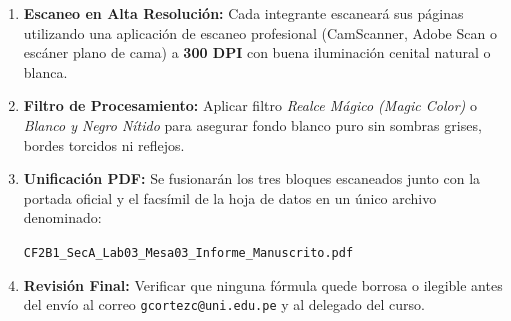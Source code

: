 \documentclass[a4paper, 10pt]{article}
\begin{document}
\begin{tcolorbox}[title=Procedimiento de Digitalización para Envío Oficial, colframe=box-green]
    \footnotesize
    \begin{enumerate}[leftmargin=1.5em, itemsep=2.5pt]
        \item \textbf{Escaneo en Alta Resolución:} Cada integrante escaneará sus páginas utilizando una aplicación de escaneo profesional (CamScanner, Adobe Scan o escáner plano de cama) a \textbf{300 DPI} con buena iluminación cenital natural o blanca.
        \item \textbf{Filtro de Procesamiento:} Aplicar filtro \textit{Realce Mágico (Magic Color)} o \textit{Blanco y Negro Nítido} para asegurar fondo blanco puro sin sombras grises, bordes torcidos ni reflejos.
        \item \textbf{Unificación PDF:} Se fusionarán los tres bloques escaneados junto con la portada oficial y el facsímil de la hoja de datos en un único archivo denominado:
        \begin{center}
            \texttt{CF2B1\_SecA\_Lab03\_Mesa03\_Informe\_Manuscrito.pdf}
        \end{center}
        \item \textbf{Revisión Final:} Verificar que ninguna fórmula quede borrosa o ilegible antes del envío al correo \texttt{gcortezc@uni.edu.pe} y al delegado del curso.
    \end{enumerate}
\end{tcolorbox}
\end{document}
